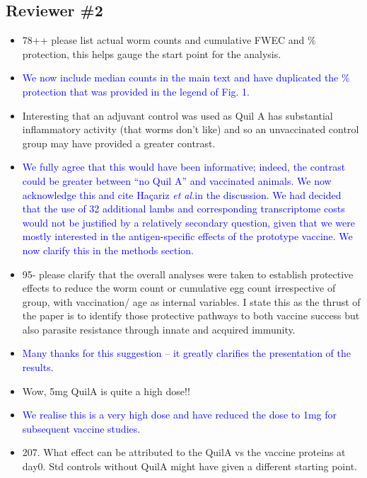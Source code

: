 \documentclass[a4paper, hidelinks, 11pt]{article}
\begin{document}
\subsection*{Reviewer \#2}

\begin{itemize}
        \item 78++ please list actual worm counts and cumulative FWEC and \% protection, this helps gauge the start point for the analysis.
        \item[\rightarrow] \textcolor{blue}{We now include median counts in the main text and have duplicated the \% protection that was provided in the legend of Fig. 1.}
        \item Interesting that an adjuvant control was used as Quil A has substantial inflammatory activity (that worms don't like) and so an unvaccinated control group may have provided a greater contrast.
        \item[\rightarrow] \textcolor{blue}{We fully agree that this would have been informative; indeed, the contrast could be greater between ``no Quil A'' and vaccinated animals. We now acknowledge this and cite Haçariz \emph{et al.}\footnotemark in the discussion. We had decided that the use of 32 additional lambs and corresponding transcriptome costs would not be justified by a relatively secondary question, given that we were mostly interested in the antigen-specific effects of the prototype vaccine. We now clarify this in the methods section.}
        \item 95- please clarify that the overall analyses were taken to establish protective effects to reduce the worm count or cumulative egg count irrespective of group, with vaccination/ age as internal variables. I state this as the thrust of the paper is to identify those protective pathways to both vaccine success but also parasite resistance through innate and acquired immunity.
        \item[\rightarrow] \textcolor{blue}{Many thanks for this suggestion -- it greatly clarifies the presentation of the results.}
        \item Wow, 5mg QuilA is quite a high dose!!
        \item[\rightarrow] \textcolor{blue}{We realise this is a very high dose and have reduced the dose to 1mg for subsequent vaccine studies.}
        \item 207. What effect can be attributed to the QuilA vs the vaccine proteins at day0. Std controls without QuilA might have given a different starting point.

\end{itemize}
\end{document}
